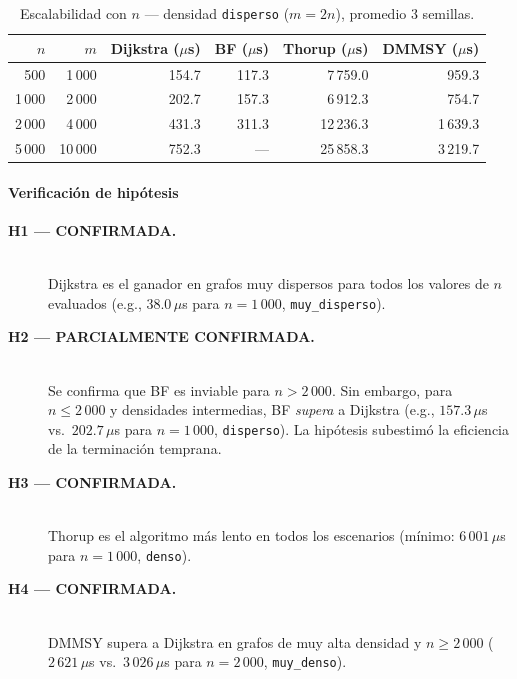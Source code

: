 \begin{table}[t]
  \centering
  \caption{Escalabilidad con $n$ — densidad \texttt{disperso} ($m=2n$),
    promedio 3 semillas.}
  \label{tab:scaling}
  \small
  \begin{tabular}{rrrrrr}
    \toprule
    \textbf{$n$} & \textbf{$m$} &
    \textbf{Dijkstra ($\mu$s)} & \textbf{BF ($\mu$s)} &
    \textbf{Thorup ($\mu$s)} & \textbf{DMMSY ($\mu$s)} \\
    \midrule
    500   & 1\,000  & 154.7  & 117.3  & 7\,759.0  & 959.3  \\
    1\,000 & 2\,000 & 202.7  & 157.3  & 6\,912.3  & 754.7  \\
    2\,000 & 4\,000 & 431.3  & 311.3  & 12\,236.3 & 1\,639.3 \\
    5\,000 & 10\,000 & 752.3 & ---    & 25\,858.3 & 3\,219.7 \\
    \bottomrule
  \end{tabular}
\end{table}

\paragraph{Verificación de hipótesis}

\begin{description}
  \item[\textbf{H1 — CONFIRMADA.}] ~\\
    Dijkstra es el ganador en grafos muy dispersos para todos los valores de
    $n$ evaluados (e.g., $38.0\,\mu$s para $n=1\,000$, \texttt{muy\_disperso}).
  \item[\textbf{H2 — PARCIALMENTE CONFIRMADA.}] ~\\
    Se confirma que BF es inviable para $n>2\,000$. Sin embargo, para
    $n \leq 2\,000$ y densidades intermedias, BF \textit{supera} a Dijkstra
    (e.g., $157.3\,\mu$s vs.\ $202.7\,\mu$s para $n=1\,000$, \texttt{disperso}).
    La hipótesis subestimó la eficiencia de la terminación temprana.
  \item[\textbf{H3 — CONFIRMADA.}] ~\\
    Thorup es el algoritmo más lento en todos los escenarios (mínimo:
    $6\,001\,\mu$s para $n=1\,000$, \texttt{denso}).
  \item[\textbf{H4 — CONFIRMADA.}] ~\\
    DMMSY supera a Dijkstra en grafos de muy alta densidad y $n \geq 2\,000$
    ($2\,621\,\mu$s vs.\ $3\,026\,\mu$s para $n=2\,000$, \texttt{muy\_denso}).
\end{description}
